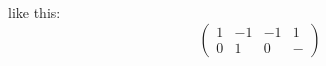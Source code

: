 \documentclass[a4paper,12pt]{article}
\begin{document}
 like this:\\
\[\begin{pmatrix}
1&-1&-1&1\\0&1&0&-
\end{pmatrix}\]
\end{document}
